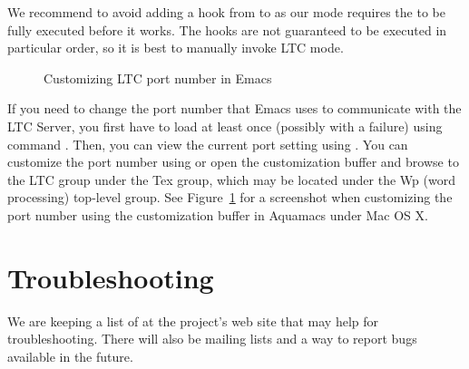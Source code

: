 We recommend to avoid adding a hook from  to  as our mode requires the  to be fully executed before it works. The hooks are not guaranteed to be executed in particular order, so it is best to manually invoke LTC mode.

\begin{figure}[t]
\centering
{}
\caption{Customizing LTC port number in Emacs} \label{fig:emacs-port}
\end{figure}

If you need to change the port number that Emacs uses to communicate with the LTC Server, you first have to load  at least once (possibly with a failure) using command .  Then, you can view the current port setting using .  You can customize the port number using  or open the customization buffer and browse to the LTC group under the Tex group, which may be located under the Wp (word processing) top-level group.  See Figure~\ref{fig:emacs-port} for a screenshot when customizing the port number using the customization buffer in Aquamacs under Mac OS X.

%

\section{Troubleshooting}

We are keeping a list of  at the project's web site that may help for troubleshooting.  There will also be mailing lists and a way to report bugs available in the future.
